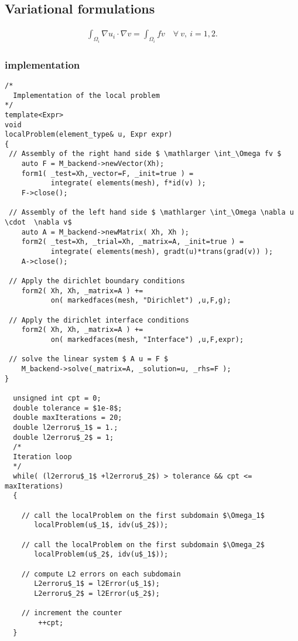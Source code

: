 \subsection{Variational formulations}
\label{sec:vari-form-2}

\begin{equation*}
  \begin{aligned}
    \int_{\Omega_i} \nabla u_i \cdot \nabla v = \int_{\Omega_i} fv   \quad \forall~ v,~i=1,2.
  \end{aligned}
\end{equation*}

\subsubsection{\FEEL implementation}
\label{sec:feel-implementation}
\begin{lstlisting}
/*
  Implementation of the local problem
*/
template<Expr>
void
localProblem(element_type& u, Expr expr)
{
 // Assembly of the right hand side $ \mathlarger \int_\Omega fv $
    auto F = M_backend->newVector(Xh);
    form1( _test=Xh,_vector=F, _init=true ) =
           integrate( elements(mesh), f*id(v) );
    F->close();

 // Assembly of the left hand side $ \mathlarger \int_\Omega \nabla u \cdot  \nabla v$
    auto A = M_backend->newMatrix( Xh, Xh );
    form2( _test=Xh, _trial=Xh, _matrix=A, _init=true ) =
           integrate( elements(mesh), gradt(u)*trans(grad(v)) );
    A->close();

 // Apply the dirichlet boundary conditions
    form2( Xh, Xh, _matrix=A ) +=
           on( markedfaces(mesh, "Dirichlet") ,u,F,g);

 // Apply the dirichlet interface conditions
    form2( Xh, Xh, _matrix=A ) +=
           on( markedfaces(mesh, "Interface") ,u,F,expr);

 // solve the linear system $ A u = F $
    M_backend->solve(_matrix=A, _solution=u, _rhs=F );
}

  unsigned int cpt = 0;
  double tolerance = $1e-8$;
  double maxIterations = 20;
  double l2erroru$_1$ = 1.;
  double l2erroru$_2$ = 1;
  /*
  Iteration loop
  */
  while( (l2erroru$_1$ +l2erroru$_2$) > tolerance && cpt <= maxIterations)
  {

    // call the localProblem on the first subdomain $\Omega_1$
       localProblem(u$_1$, idv(u$_2$));

    // call the localProblem on the first subdomain $\Omega_2$
       localProblem(u$_2$, idv(u$_1$));

    // compute L2 errors on each subdomain
       L2erroru$_1$ = l2Error(u$_1$);
       L2erroru$_2$ = l2Error(u$_2$);

    // increment the counter
        ++cpt;
  }

\end{lstlisting}

